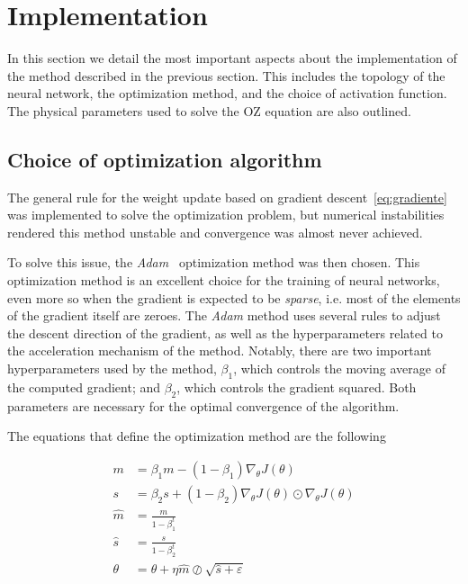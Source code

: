\section{Implementation}
In this section we detail the most important aspects about the implementation of the
method described in the previous section. This includes the topology of the neural network,
the optimization method, and the choice of activation function. The physical parameters used
to solve the OZ equation are also outlined.

\subsection{Choice of optimization algorithm}
The general rule for the weight update based on gradient descent~\eqref{eq:gradiente} was
implemented to solve the optimization problem, but numerical instabilities rendered this 
method unstable and convergence was almost never achieved.

To solve this issue, the \emph{Adam}~\cite{kingmaAdamMethodStochastic2017} optimization 
method was then chosen. This optimization method is an excellent choice for the training
of neural networks, even more so when the gradient is expected to be \emph{sparse}, i.e.
most of the elements of the gradient itself are zeroes.
The \emph{Adam} method uses several rules to adjust the descent direction of the gradient,
as well as the hyperparameters related to the acceleration mechanism of the method.
Notably, there are two important hyperparameters used by the method, $\beta_1$,
which controls the moving average of the computed gradient; and $\beta_2$, which controls
the gradient squared. Both parameters are necessary for the optimal convergence of the
algorithm.

The equations that define the optimization method are the following

\begin{align}
    m &= \beta_1 m - (1 - \beta_1) \nabla_{\theta} J(\theta) \nonumber \\
    s &= \beta_2 s + (1 - \beta_2) \nabla_{\theta} J(\theta) \odot \nabla_{\theta} J(\theta) \nonumber \\
    \hat{m} &= \frac{m}{1 - \beta_1^t} \nonumber \\
    \hat{s} &= \frac{s}{1 - \beta_2^t} \nonumber \\
    \theta &= \theta + \eta \hat{m} \oslash \sqrt{\hat{s} + \varepsilon}
    \label{eq:adam}
\end{align}

